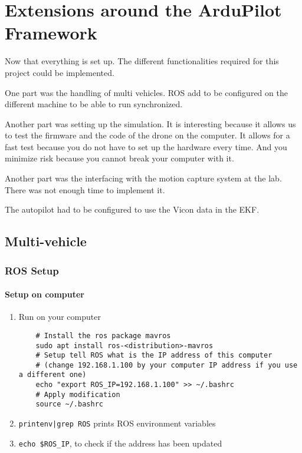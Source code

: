 \chapter{Extensions around the ArduPilot Framework}

Now that everything is set up.
The different functionalities required for this project could be implemented.

One part was the handling of multi vehicles.
ROS add to be configured on the different machine to be able to run synchronized.

Another part was setting up the simulation.
It is interesting because it allows us to test the firmware and the code of the drone on the computer.
It allows for a fast test because you do not have to set up the hardware every time.
And you minimize risk because you cannot break your computer with it.

Another part was the interfacing with the motion capture system at the lab.
There was not enough time to implement it.

The autopilot had to be configured to use the Vicon data in the EKF.

\section{Multi-vehicle}

\subsection{ROS Setup}
\subsubsection{Setup on computer}
\begin{enumerate}
    \item Run on your computer

          \begin{verbatim}
    # Install the ros package mavros
    sudo apt install ros-<distribution>-mavros
    # Setup tell ROS what is the IP address of this computer
    # (change 192.168.1.100 by your computer IP address if you use a different one)
    echo "export ROS_IP=192.168.1.100" >> ~/.bashrc
    # Apply modification
    source ~/.bashrc
                    \end{verbatim}
    \item \texttt{printenv|grep ROS} prints ROS environment variables
    \item \texttt{echo \$ROS\_IP}, to check if the address has been updated
\end{enumerate}

